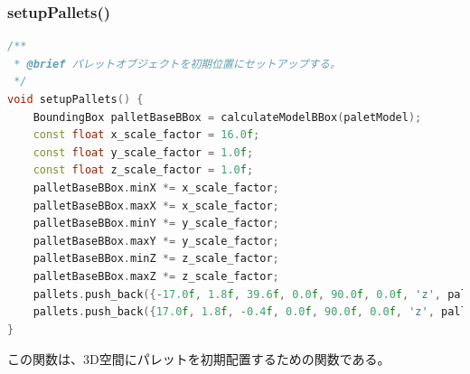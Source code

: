 \documentclass[uplatex,dvipdfmx,a4paper]{jsarticle}
\begin{document}
\hypertarget{func:setupPallets}{}\subsubsection{setupPallets()}\label{func:setupPallets}
\begin{lstlisting}[language=C++, caption={setupPallets() 関数}, label={lst:setupPallets_detail}]
/**
 * @brief パレットオブジェクトを初期位置にセットアップする。
 */
void setupPallets() {
    BoundingBox palletBaseBBox = calculateModelBBox(paletModel);
    const float x_scale_factor = 16.0f;
    const float y_scale_factor = 1.0f;
    const float z_scale_factor = 1.0f;
    palletBaseBBox.minX *= x_scale_factor;
    palletBaseBBox.maxX *= x_scale_factor;
    palletBaseBBox.minY *= y_scale_factor;
    palletBaseBBox.maxY *= y_scale_factor;
    palletBaseBBox.minZ *= z_scale_factor;
    palletBaseBBox.maxZ *= z_scale_factor;
    pallets.push_back({-17.0f, 1.8f, 39.6f, 0.0f, 90.0f, 0.0f, 'z', palletBaseBBox, IDLE, 1.8f, 0.15f, false});
    pallets.push_back({17.0f, 1.8f, -0.4f, 0.0f, 90.0f, 0.0f, 'z', palletBaseBBox, IDLE, 1.8f, 0.15f, false});
}
\end{lstlisting}
この関数は、3D空間にパレットを初期配置するための関数である。
\end{document}
